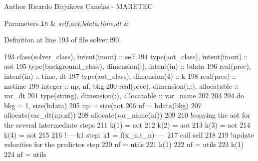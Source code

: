 \begin{DoxyAuthor}{Author}
Ricardo Birjukovs Canelas -\/ M\+A\+R\+E\+T\+EC 
\end{DoxyAuthor}

\begin{DoxyParams}[1]{Parameters}
\mbox{\tt in}  & {\em self,aot,bdata,time,dt} & \\
\hline
\end{DoxyParams}


Definition at line 193 of file solver.\+f90.


\begin{DoxyCode}
193     \textcolor{keywordtype}{class}(solver\_class), \textcolor{keywordtype}{intent(inout)} :: self
194     \textcolor{keywordtype}{type}(aot\_class), \textcolor{keywordtype}{intent(inout)} :: aot
195     \textcolor{keywordtype}{type}(background\_class), \textcolor{keywordtype}{dimension(:)}, \textcolor{keywordtype}{intent(in)} :: bdata
196     \textcolor{keywordtype}{real(prec)}, \textcolor{keywordtype}{intent(in)} :: time, dt
197     \textcolor{keywordtype}{type}(aot\_class), \textcolor{keywordtype}{dimension(4)} :: k
198     \textcolor{keywordtype}{real(prec)} :: mstime
199     \textcolor{keywordtype}{integer} :: np, nf, bkg
200     \textcolor{keywordtype}{real(prec)}, \textcolor{keywordtype}{dimension(:,:)}, \textcolor{keywordtype}{allocatable} :: var\_dt
201     \textcolor{keywordtype}{type}(string), \textcolor{keywordtype}{dimension(:)}, \textcolor{keywordtype}{allocatable} :: var\_name
202 
203 
204     \textcolor{keywordflow}{do} bkg = 1, \textcolor{keyword}{size}(bdata)
205         np = \textcolor{keyword}{size}(aot%
206         nf = bdata(bkg)%
207         \textcolor{keyword}{allocate}(var\_dt(np,nf))
208         \textcolor{keyword}{allocate}(var\_name(nf))
209 
210         \textcolor{comment}{!copying the aot for the several intermediate steps}
211         k(1) = aot
212         k(2) = aot
213         k(3) = aot
214         k(4) = aot
215 
216         \textcolor{comment}{!-----k1 step: k1 = f(x\_n,t\_n)-----}
217         \textcolor{keyword}{call }self%
218 
219         \textcolor{comment}{!update velocities for the predictor step}
220         nf = utils%
221         k(1)%
222         nf = utils%
223         k(1)%
224         nf = utils%

\end{DoxyCode}
